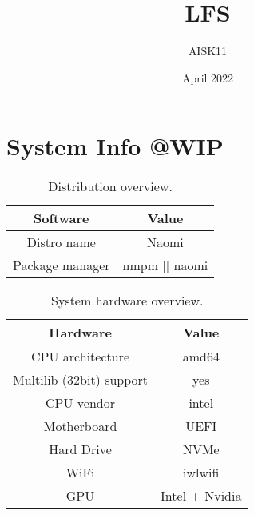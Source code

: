 \documentclass[10pt, a4paper, onecolumn, oneside, titlepage, openany]{book}
\title{\textbf{LFS}}
\author{AISK11}
\date{April 2022}
\begin{document}
\maketitle
\tableofcontents

\chapter{System Info @WIP}
\begin{table}[!ht]
\centering
\begin{tabular}{|c|c|}
    \hline
    \textbf{Software} & \textbf{Value} \\
    \hline
    Distro name & Naomi\\
    Package manager & nmpm || naomi\\
    \hline
\end{tabular}
\caption{Distribution overview.}
\label{table:1}
\end{table}


\begin{table}[!ht]
\centering
\begin{tabular}{|c|c|}
    \hline
    \textbf{Hardware} & \textbf{Value} \\
    \hline
    CPU architecture & amd64\\
    Multilib (32bit) support& yes\\
    CPU vendor & intel\\
    Motherboard & UEFI\\
    Hard Drive & NVMe\\
    WiFi & iwlwifi\\
    GPU & Intel + Nvidia\\
    \hline
\end{tabular}
\caption{System hardware overview.}
\label{table:2}
\end{table}
\end{document}

